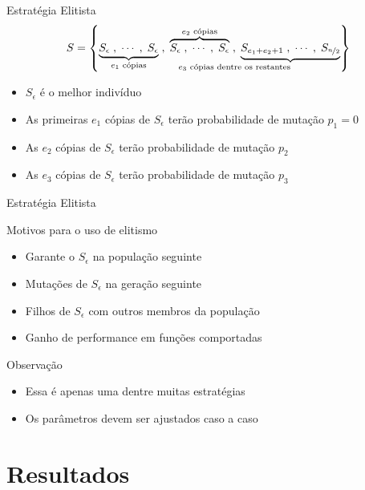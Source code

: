 \begin{frame}{Estratégia Elitista}
  $$
    S =
    \left\{
    \underbrace{S_{\epsilon}\;, \mathdots,  \;S_{\epsilon}}_{e_1 \text{ cópias}}\;,\;
    \overbrace{S_{\epsilon}\;, \mathdots,  \;S_{\epsilon}}^{e_2 \text{ cópias}}\;,\;
    \underbrace{S_{e_1 + e_2 + 1}\;, \mathdots,  \;S_{\nicefrac{n}{2}}}_{\mathllap{e_3 \text{ cópias dentre os restantes}}}
    \right\}
  $$
  \begin{itemize}
    \item $S_\epsilon$ é o melhor indivíduo
    \item As primeiras $e_1$ cópias de $S_\epsilon$ terão probabilidade de mutação $p_1 = 0$
    \item As $e_2$ cópias de $S_\epsilon$ terão probabilidade de mutação $p_2$
    \item As $e_3$ cópias de $S_\epsilon$ terão probabilidade de mutação $p_3$
  \end{itemize}
\end{frame}

\begin{frame}{Estratégia Elitista}
  \begin{block}{Motivos para o uso de elitismo}
    \begin{itemize}
      \item Garante o $S_\epsilon$ na população seguinte
      \item Mutações de $S_\epsilon$ na geração seguinte
      \item Filhos de $S_\epsilon$ com outros membros da população
      \item Ganho de performance em funções comportadas
    \end{itemize}
  \end{block}
  \begin{alertblock}{Observação}
    \begin{itemize}
      \item Essa é apenas uma dentre muitas estratégias \cite{goldberg1989ga}
      \item Os parâmetros devem ser ajustados caso a caso
    \end{itemize}
  \end{alertblock}
\end{frame}

\section{Resultados}

